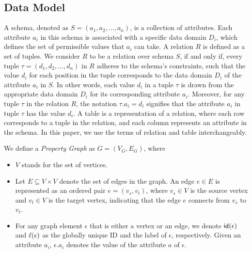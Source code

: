 
\subsection{Data Model}
\label{sec:data-model}

A schema, denoted as \(S = (a_1, a_2, \ldots, a_n)\), is a collection of attributes. Each attribute \(a_i\) in this schema is associated with a specific data domain \(D_i\), which defines the set of permissible values that \(a_i\) can take.
A relation \(R\) is defined as a set of tuples. We consider \(R\) to be a relation over schema \(S\), if and only if, every tuple \(\tau = (d_1, d_2, \ldots, d_n)\) in \(R\) adheres to the schema's constraints, such that the value \(d_i\) for each position in the tuple corresponds to the data domain \(D_i\) of the attribute \(a_i\) in \(S\). In other words, each value \(d_i\) in a tuple \(\tau\) is drawn from the appropriate data domain \(D_i\) for its corresponding attribute \(a_i\).
Moreover, for any tuple \(\tau\) in the relation \(R\), the notation \(\tau.a_i = d_i\) signifies that the attribute \(a_i\) in tuple \(\tau\) has the value \(d_i\). A table is a representation of a relation, where each row corresponds to a tuple in the relation, and each column represents an attribute in the schema. In this paper, we use the terms of relation and table interchangeably.

We define a \emph{Property Graph} as $G = (V_G, E_G)$,
where

\begin{itemize}
    \item $V$ stands for the set of vertices.
    \item Let $E \subseteq V \times V$ denote the set of edges in the graph. An edge $e \in E$ is represented as an ordered pair $e = (v_s, v_t)$, where $v_s \in V$ is the source vertex and $v_t \in V$ is the target vertex, indicating that the edge $e$ connects from $v_s$ to $v_t$.
    \item For any graph element $\epsilon$ that is either a vertex or an edge, we denote ${\mathsf{id}}(\epsilon)$ and $\mathcal{\ell}(\epsilon)$ as the globally unique ID and the label of $\epsilon$, respectively. Given an attribute $a_i$, $\epsilon.a_i$ denotes the value of the attribute $a$ of $\epsilon$.
\end{itemize}


